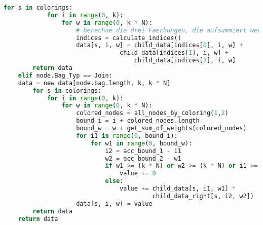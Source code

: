\begin{svgraybox}
\begin{lstlisting}[language=python,label={code:pseudo}, caption=Pseudocode für das dynamische Programm]
        for s in colorings:
            for i in range(0, k):
                for w in range(0, k * N):
                    # berechne die drei Faerbungen, die aufsummiert werden
                    indices = calculate_indices()
                    data[s, i, w] = child_data[indices[0], i, w] +
                    		    child_data[indices[1], i, w] +
                                    child_data[indices[2], i, w]
        return data
    elif node.Bag_Typ == Join:
	data = new data[node.bag.length, k, k * N]
        for s in colorings:
            for i in range(0, k):
                for w in range(0, k * N):
                    colored_nodes = all_nodes_by_coloring(1,2)
                    bound_i = i + colored_nodes.length
                    bound_w = w + get_sum_of_weights(colored_nodes)
                    for i1 in range(0, bound_i):
                        for w1 in range(0, bound_w):
                            i2 = acc_bound_1 - i1
                            w2 = acc_bound_2 - w1
                            if w1 >= (k * N) or w2 >= (k * N) or i1 >= k or i2 >= k:
                                value += 0
                            else:
                                value += child_data[s, i1, w1] *   
                                         child_data_right[s, i2, w2])
                    data[s, i, w] = value
        return data
    return data

\end{lstlisting}
\end{svgraybox}

